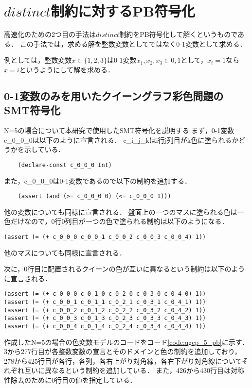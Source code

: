 \section{$distinct$制約に対するPB符号化} \label{sec:pb}
高速化のための2つ目の手法は$distinct$制約をPB符号化して解くというものである．
この手法では，求める解を整数変数としてではなく0-1変数として求める．

例としては，整数変数$x \in \{1,2,3\}$は0-1変数$x_1,x_2,x_3 \in {0,1}$として，$x_i=1$なら$x=i$というようにして解を求める．

\subsection{0-1変数のみを用いたクイーングラフ彩色問題のSMT符号化} \label{sec:pb4smt}
N=5の場合について本研究で使用したSMT符号化を説明する
まず，0-1変数c\_0\_0\_0は以下のように宣言される．
c\_i\_j\_kはi行j列目がk色に塗られるかどうかを示している．
\begin{verbatim}
    (declare-const c_0_0_0 Int)
\end{verbatim}
また，c\_0\_0\_0は0-1変数であるので以下の制約を追加する．
\begin{verbatim}
    (assert (and (>= c_0_0_0 0) (<= c_0_0_0 1)))
\end{verbatim}
他の変数についても同様に宣言される．
盤面上の一つのマスに塗られる色は一色だけなので，0行0列目が一つの色で塗られる制約は以下のようになる．
\begin{verbatim}
(assert (= (+ c_0_0_0 c_0_0_1 c_0_0_2 c_0_0_3 c_0_0_4) 1))
\end{verbatim}
他のマスについても同様に宣言される．

次に，0行目に配置されるクイーンの色が互いに異なるという制約は以下のように宣言される．
\begin{verbatim}
(assert (= (+ c_0_0_0 c_0_1_0 c_0_2_0 c_0_3_0 c_0_4_0) 1))
(assert (= (+ c_0_0_1 c_0_1_1 c_0_2_1 c_0_3_1 c_0_4_1) 1))
(assert (= (+ c_0_0_2 c_0_1_2 c_0_2_2 c_0_3_2 c_0_4_2) 1))
(assert (= (+ c_0_0_3 c_0_1_3 c_0_2_3 c_0_3_3 c_0_4_3) 1))
(assert (= (+ c_0_0_4 c_0_1_4 c_0_2_4 c_0_3_4 c_0_4_4) 1))
\end{verbatim}

作成したN=5の場合の色変数モデルのコードをコード\ref{code:qgcp_5_pb}に示す．
3から277行目が各整数変数の宣言とそのドメインと色の制約を追加しており，
278から425行目が各行，各列，各右上がり対角線，各右下がり対角線についてそれぞれ互いに異なるという制約を追加している．
また，426から430行目は対称性除去のために0行目の値を指定している．


